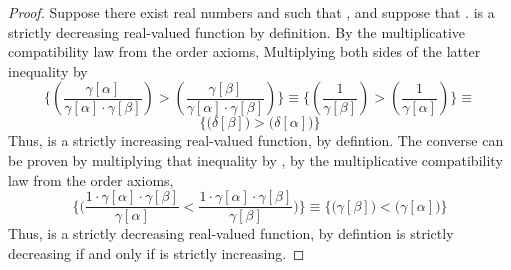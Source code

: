 \documentclass[preview]{standalone}
\begin{document}
\begin{proof}
    Suppose there exist real numbers \bm{$\alpha$} and \bm{$\beta$} such that 
    \bm{$\alpha < \beta$}, and suppose that 
    \bm{$\gamma[ \alpha ] > \gamma[ \beta ]$}. \bm{$\gamma$} is a strictly decreasing real-valued function by definition. 
    By the multiplicative compatibility law from the order axioms, 
    Multiplying both sides of the latter inequality by 
    \begin{equation*}
        \Bigg\{
            \left(
                \frac{\gamma[\alpha]}{\gamma[\alpha] \cdot \gamma[\beta]}
            \right)
                >
            \left(
                \frac{\gamma[\beta]}{\gamma[\alpha] \cdot \gamma[\beta]}
            \right)  
        \Bigg\}
            \equiv
        \Bigg\{
            \left(
                \frac{1}{\gamma[\beta]}
            \right)
                >
            \left(
                \frac{1}{\gamma[\alpha]}
            \right)
        \Bigg\}
            \equiv
    \end{equation*}
    \begin{equation*}
        \Bigg\{
            \bigg(
                \delta[\beta]
            \bigg)
                >
            \bigg(
                \delta[\alpha]
            \bigg)
        \Bigg\}
    \end{equation*}
    Thus, \bm{$\delta$} is a strictly increasing real-valued function,
    by defintion.
    The converse can be proven by multiplying that inequality
    \bm{$\delta[\alpha] < \delta[\beta]$} by \bm{$\gamma[\alpha]\gamma[\beta]$},
    by the multiplicative compatibility law from the order axioms,
    \begin{equation*}
        \Bigg\{
            \bigg(
                \frac{1 \cdot \gamma[\alpha] \cdot \gamma[\beta]}{\gamma[\alpha]}
                    <
                \frac{1 \cdot \gamma[\alpha] \cdot \gamma[\beta]}{\gamma[\beta]}
            \bigg)
        \Bigg\}
            \equiv
        \Bigg\{
            \bigg(
                \gamma[\beta]
            \bigg)
                <
            \bigg(
                \gamma[\alpha]
            \bigg)
        \Bigg\} 
    \end{equation*}
    Thus, \bm{$\gamma$} is a strictly decreasing real-valued function, by defintion
    \bm{$\therefore \text{\space} \gamma[\alpha]$} is strictly decreasing
    if and only if
    \bm{$\delta[\alpha]$} is strictly increasing.
\end{proof}
\end{document}

